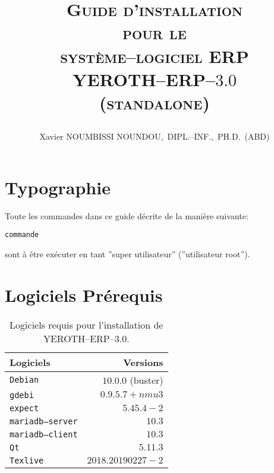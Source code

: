 \documentclass[a4paper, 10pt]{article}
\newcommand{\texlive}{\texttt{Texlive}\xspace}
\newcommand{\gdebi}{\texttt{gdebi}\xspace}
\newcommand{\expect}{\texttt{expect}\xspace}
\newcommand{\debian}{\texttt{Debian}\xspace}
\newcommand{\qt}{\texttt{Qt}\xspace}
\newcommand{\mariadbserver}{\texttt{mariadb--server}\xspace}
\newcommand{\mariadbclient}{\texttt{mariadb--client}\xspace}
\newcommand{\yerotherptroiszero}{\textcolor{yerenColorBlue}{\sc YEROTH--ERP--$3.0$}\xspace}
\newcommand{\yerotherp}{\textcolor{yerenColorBlue}{\sc YEROTH--ERP--$3.0$}\xspace}
\newcommand{\erp}{syst\`eme--logiciel ERP\xspace}
\newcommand{\myfullacademicname}{Xavier NOUMBISSI NOUNDOU,~DIPL.--INF.,~PH.D.~(ABD)\xspace}
\newcommand{\rootcommand}[1]{
\begin{center}
\textcolor{purplish}{#1\xspace}
\end{center}}
\begin{document}

\title{
\vspace{-1.65em}
\textcolor{medgreen}{\textsc{Guide d'installation \\
										pour le \\
									 \erp \\ \vspace{1em}
									 \yerotherp \\ 
									 \hspace{0.6em} \textcolor{yerenColorBlue}{(standalone)} }}
									 \author{\myfullacademicname}
}

\date{} 
\maketitle
\thispagestyle{fancy}

\vspace{-0.5em}

{}
\begingroup
\tableofcontents
\endgroup


\vspace{0.25cm}

\section{Typographie}

Toute les commandes dans ce guide d\'ecrite
de la mani\`ere suivante:
	\begin{alltt}
		\rootcommand{commande}
	\end{alltt}
sont \`a \^etre ex\'ecuter en tant
''super utilisateur'' (''utilisateur root'').

\section{Logiciels Pr\'erequis}

\begin{table}[!htbp]
\centering
\begin{tabular}{l|r}
\textbf{Logiciels}	&
\textbf{Versions}	\\ \hline
\debian				&
$10.0.0$ (buster)	\\ \hline
\gdebi				&
$0.9.5.7+nmu3$		\\ \hline
\expect				&
$5.45.4-2$			\\ \hline
\mariadbserver		&
$10.3$				\\ \hline
\mariadbclient		&
$10.3$				\\ \hline
\qt					&
$5.11.3$			\\ \hline	
\texlive			&
$2018.20190227-2$	\\ 			
\end{tabular}
\caption{Logiciels requis pour l'installation de \yerotherptroiszero.}
\label{tab:dependance-logiciel}
\end{table}
\end{document}
